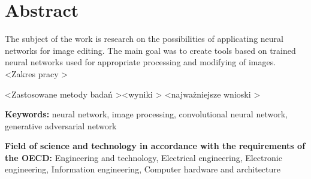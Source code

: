 \section*{Abstract}
  The subject of the work is research on the possibilities of applicating
  neural networks for image editing. The main goal was to create tools based on
  trained neural networks used for appropriate processing and modifying of
  images. \textless Zakres pracy \textgreater

  \textless Zastosowane metody badań \textgreater \textless wyniki \textgreater
  \textless najważniejsze wnioski \textgreater

  \bigskip

  \noindent\textbf{Keywords:} neural network, image processing, convolutional
  neural network, generative adversarial network

  \bigskip

  \noindent\textbf{Field of science and technology in accordance with the
  requirements of the OECD:} Engineering and technology, Electrical engineering,
  Electronic engineering, Information engineering, Computer hardware and
  architecture

